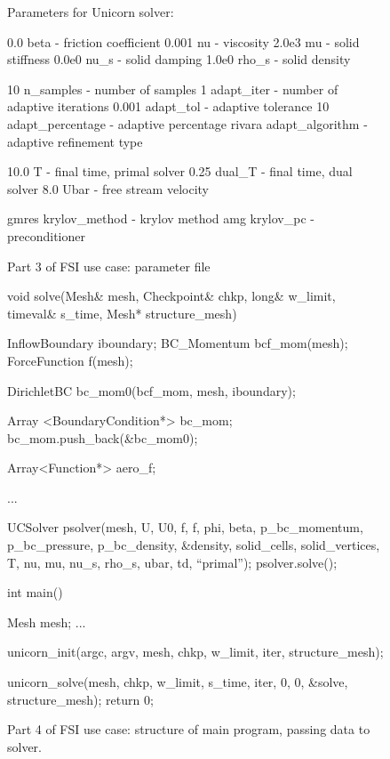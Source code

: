\begin{figure}
\bwfig
\begin{c++}
Parameters for Unicorn solver:

0.0       beta - friction coefficient
0.001     nu - viscosity
2.0e3     mu - solid stiffness
0.0e0     nu_s - solid damping
1.0e0     rho_s - solid density

10        n_samples - number of samples
1         adapt_iter - number of adaptive iterations
0.001     adapt_tol - adaptive tolerance
10        adapt_percentage - adaptive percentage
rivara    adapt_algorithm - adaptive refinement type

10.0       T - final time, primal solver
0.25      dual_T - final time, dual solver
8.0       Ubar - free stream velocity

gmres     krylov_method - krylov method
amg       krylov_pc - preconditioner
\end{c++}
\caption{Part 3 of FSI use case: parameter file}
\label{code:UseCasePart3}
\end{figure}

\begin{figure}
\bwfig
\begin{c++}
void solve(Mesh& mesh, Checkpoint& chkp,
  long& w_limit, timeval& s_time,
  Mesh* structure_mesh)
{
  InflowBoundary iboundary;
  BC_Momentum bcf_mom(mesh);
  ForceFunction f(mesh);

  DirichletBC bc_mom0(bcf_mom, mesh, iboundary);

  Array <BoundaryCondition*> bc_mom;
  bc_mom.push_back(&bc_mom0);

  Array<Function*> aero_f;

  ...

 UCSolver psolver(mesh, U, U0, f, f, phi, beta, p_bc_momentum,
                  p_bc_pressure, p_bc_density, &density,
                  solid_cells, solid_vertices, T, nu, mu,
                  nu_s, rho_s, ubar, td, ``primal'');
  psolver.solve();
}

int main()
{
  Mesh mesh;
  ...

  unicorn_init(argc, argv, mesh, chkp, w_limit, iter, structure_mesh);

  unicorn_solve(mesh, chkp, w_limit, s_time, iter, 0, 0,
                &solve, structure_mesh);
  return 0;
}
\end{c++}
\caption{Part 4 of FSI use case: structure of main program, passing data to solver.}
\label{code:UseCasePart4}
\end{figure}

